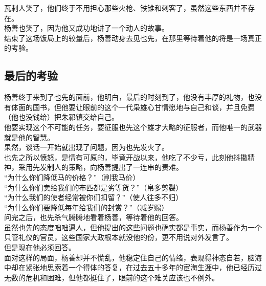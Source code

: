 \begin{multicols}{\theparacolNo}
瓦剌人笑了，他们终于不用担心那些火枪、铁锥和刺客了，虽然这些东西并不存在。\\

杨善也笑了，因为他又成功地讲了一个动人的故事。\\

结束了这场饭局上的较量后，杨善动身去见也先，在那里等待着他的将是一场真正的考验。\\

\subsection{最后的考验}
杨善终于来到了也先的面前，他明白，最后的时刻到了，他没有丰厚的礼物，也没有体面的国书，但他要让眼前的这个一代枭雄心甘情愿地与自己和谈，并且免费（他也没钱给）把朱祁镇交给自己。\\

他要实现这个不可能的任务，要征服也先这个雄才大略的征服者，而他唯一的武器就是他的智慧。\\

果然，谈话一开始就出现了问题，因为也先发火了。\\

也先之所以愤怒，是情有可原的，毕竟开战以来，他吃了不少亏，此刻他抖擞精神，采用先发制人的策略，向杨善提出了一连串的责难。\\

“为什么你们降低马的价格？”（削我马价）\\

“为什么你们卖给我们的布匹都是劣等货？”（帛多剪裂）\\

“为什么我们的使者经常被你们扣留？”（使人往多不归）\\

“为什么你们要降低每年给我们的封赏？”（减岁赐）\\

问完之后，也先杀气腾腾地看着杨善，等待着他的回答。\\

虽然也先的态度咄咄逼人，但他提出的这些问题也确实都是事实，而杨善作为一个只管礼仪的官员，这些国家大政根本就没他的份，更不用说对外发言了。\\

但是现在他必须回答。\\

面对这样的局面，杨善却并不慌乱，他稳定住自己的情绪，表现得神态自若，脑海中却在紧张地思索着一个得体的答复，在过去五十多年的宦海生涯中，他已经历过无数的危机和困难，但他都挺住了，眼前的这个难关应该也不例外。\\


\end{multicols}
